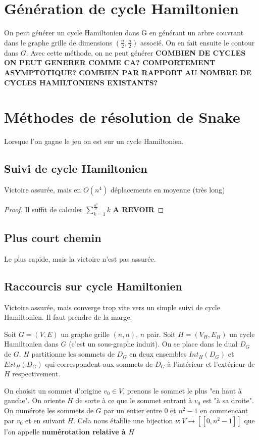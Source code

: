 \documentclass{article}
\newtheorem{proof}{Preuve}[section]
\begin{document}
\section{Génération de cycle Hamiltonien}
On peut générer un cycle Hamiltonien dans G en générant un arbre couvrant dans le graphe grille de dimensions $(\frac{n}{2},\frac{n}{2})$ associé. On en fait ensuite le contour dans $G$. Avec cette méthode, on ne peut générer \textbf{COMBIEN DE CYCLES ON PEUT GENERER COMME CA? COMPORTEMENT ASYMPTOTIQUE? COMBIEN PAR RAPPORT AU NOMBRE DE CYCLES HAMILTONIENS EXISTANTS?} 

\section{Méthodes de résolution de Snake}

Lorsque l'on gagne le jeu on est sur un cycle Hamiltonien.

\subsection{Suivi de cycle Hamiltonien}
Victoire assurée, mais en $O(n^{4})$ déplacements en moyenne (très long)

\begin{proof}
Il suffit de calculer $\sum\limits_{k=1}^{\frac{n^{2}}{2}}k$ \textbf{A REVOIR}
\end{proof}

\subsection{Plus court chemin}
Le plus rapide, mais la victoire n'est pas assurée.


\subsection{Raccourcis sur cycle Hamiltonien}
Victoire assurée, mais converge trop vite vers un simple suivi de cycle Hamiltonien. Il faut prendre de la marge.

Soit $G=(V,E)$ un graphe grille $(n,n)$, $n$ pair. Soit $H=(V_H,E_H)$ un cycle Hamiltonien dans $G$ (c'est un sous-graphe induit). On se place dans le dual $D_G$ de $G$. $H$ partitionne les sommets de $D_G$ en deux ensembles $Int_{H}(D_G)$ et $Ext_{H}(D_G)$ qui correspondent aux sommets de $D_G$ à l'intérieur et l'extérieur de $H$ respectivement.

\smallskip

On choisit un sommet d'origine $v_0 \in V$, prenons le sommet le plus "en haut à gauche". On oriente $H$ de sorte à ce que le sommet entrant à $v_0$ est "à sa droite". On numérote les sommets de $G$ par un entier entre $0$ et $n^2-1$ en commencant par $v_0$ et en suivant $H$. Cela nous établie une bijection $\nu : V \to [\![0,n^2-1]\!]$ que l'on appelle \textbf{numérotation relative à $H$}
\end{document}
